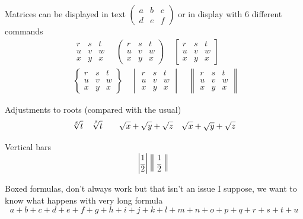 \documentclass[12pt,a4paper]{article}
\theoremstyle{clearprint}
\begin{document}
\noindent
Matrices can be displayed in text $\left(\begin{smallmatrix} a & b & c \\ d & e & f\end{smallmatrix}\right)$ or in display with 6 different commands
\begin{eqnarray*}
&&\begin{matrix} r & s & t \\ u & v & w \\ x & y & x\end{matrix}\quad
\begin{pmatrix} r & s & t \\ u & v & w \\ x & y & x\end{pmatrix}\quad
\begin{bmatrix} r & s & t \\ u & v & w \\ x & y & x\end{bmatrix}\\
&&\begin{Bmatrix} r & s & t \\ u & v & w \\ x & y & x\end{Bmatrix}\quad
\begin{vmatrix} r & s & t \\ u & v & w \\ x & y & x\end{vmatrix}\quad
\begin{Vmatrix} r & s & t \\ u & v & w \\ x & y & x\end{Vmatrix}\quad
\end{eqnarray*}

\noindent
Adjustments to roots (compared with the usual)
\begin{equation}
\sqrt[\beta]{t}\quad\sqrt[\leftroot{-1}\uproot{3}\beta]{t}\qquad \sqrt{x} + \sqrt{\smash[b]{y}} + \sqrt{z} \quad \sqrt{x} + \sqrt{y} + \sqrt{z}
\end{equation}

\noindent
Vertical bars
\begin{equation}
\left\lvert \frac{1}{2}\right\rvert \left\lVert \frac{1}{2}\right\rVert
\end{equation}

\noindent
Boxed formulas, don't always work but that isn't an issue I suppose, we want to know what happens with very long formula
\begin{equation}
\boxed{a + b + c + d + e + f + g + h + i + j + k + l + m + n + o + p + q + r + s + t + u}
\end{equation}
\end{document}
